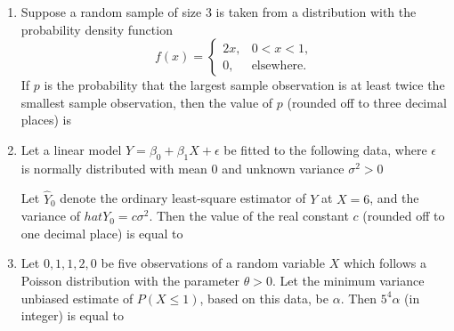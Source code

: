 \documentclass[journal]{IEEEtran}
\begin{document}
\begin{enumerate}
    \item Suppose a random sample of size $3$ is taken from a distribution with the probability density function $$f(x)=
        \begin{cases}
            2x, & 0<x<1,\\
            0, & \text{elsewhere.}
        \end{cases}$$
        If $p$ is the probability that the largest sample observation is at least twice the smallest sample observation, then the value of $p$ (rounded off to three decimal places) is \underline{\hspace{1cm}}

    \item Let a linear model $Y=\beta_0+\beta_1X+\epsilon$ be fitted to the following data, where $\epsilon$ is normally distributed with mean $0$ and unknown variance $\sigma^2>0$
        \begin{table}[!ht]
            \centering
            
        \end{table}
        Let $\hat{Y}_{0}$ denote the ordinary least-square estimator of $Y$ at $X = 6$, and the variance of $hat{Y}_0=c\sigma^2$. Then the value of the real constant $c$ (rounded off to one decimal place) is equal to \underline{\hspace{1cm}}

    \item Let $0, 1, 1, 2, 0$ be five observations of a random variable $X$ which follows a Poisson distribution with the parameter $\theta > 0$. Let the minimum variance unbiased estimate of $P(X \leq 1)$, based on this data, be $\alpha$. Then $5^4\alpha$ (in integer) is equal to \underline{\hspace{1cm}}

    \end{enumerate}
\end{document}
